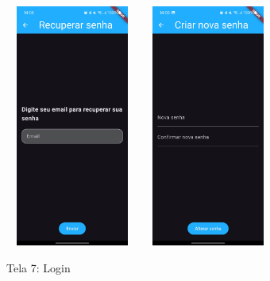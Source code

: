     \begin{figure}[h]
        \centering
        \includegraphics[width=44mm,height=80mm]{imagens/email.jpg} %
        \hspace{10mm}
        \includegraphics[width=44mm,height=80mm]{imagens/nova-senha.jpg} %
        \caption{\scriptsize Tela 7: Login}
        \label{fig:tela7-recuperacao}
    \end{figure}

    \FloatBarrier